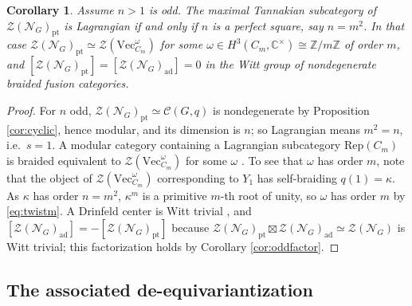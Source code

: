 \documentclass[10pt]{article}
\theoremstyle{plain}
\newtheorem{corollary}[theorem]{Corollary}
\theoremstyle{definition}
\theoremstyle{plain}
\begin{document}
\begin{corollary}\label{cor:lag}
Assume $n>1$ is odd.  The maximal Tannakian subcategory of
$\mathcal{Z}(\mathcal{N}_G)_{\mathrm{pt}}$ is Lagrangian if and only if $n$ is a
perfect square, say $n=m^{2}$.  In that case
$\mathcal{Z}(\mathcal{N}_G)_{\mathrm{pt}}\simeq
\mathcal{Z}(\mathrm{Vec}^{\omega}_{C_m})$ for some
$\omega\in H^{3}(C_m,\mathbb{C}^{\times})\cong\mathbb{Z}/m\mathbb{Z}$ of order $m$, and
$[\mathcal{Z}(\mathcal{N}_G)_{\mathrm{pt}}]
=[\mathcal{Z}(\mathcal{N}_G)_{\mathrm{ad}}]=0$ in the Witt group of
nondegenerate braided fusion categories.
\end{corollary}
 
\begin{proof}
For $n$ odd, $\mathcal{Z}(\mathcal{N}_G)_{\mathrm{pt}}\simeq\mathcal{C}(G,q)$ is nondegenerate by
Proposition \ref{cor:cyclic}, hence modular, and its dimension is $n$; so
Lagrangian means $m^{2}=n$, i.e.\ $s=1$.  A modular category containing a
Lagrangian subcategory $\mathrm{Rep}(C_m)$ is braided equivalent to
$\mathcal{Z}(\mathrm{Vec}^{\omega}_{C_m})$ for some $\omega$ \cite[Theorem 4.64]{MR2609644}. To see that $\omega$ has order $m$, note that the object of $\mathcal{Z}(\mathrm{Vec}^{\omega}_{C_m})$ corresponding to $Y_1$ has self-braiding $q(1)=\kappa$. As $\kappa$ has order $n=m^2$, $\kappa^m$ is a primitive $m$-th root of unity, so $\omega$ has order $m$ by \eqref{eq:twistm}.  A Drinfeld center is Witt trivial \cite{MR3039775}, and
$[\mathcal{Z}(\mathcal{N}_G)_{\mathrm{ad}}]
=-[\mathcal{Z}(\mathcal{N}_G)_{\mathrm{pt}}]$ because
$\mathcal{Z}(\mathcal{N}_G)_{\mathrm{pt}}\boxtimes
\mathcal{Z}(\mathcal{N}_G)_{\mathrm{ad}}\simeq\mathcal{Z}(\mathcal{N}_G)$ is Witt
trivial; this factorization holds by Corollary \ref{cor:oddfactor}.
\end{proof}


\subsection{The associated de-equivariantization}\label{subsec:assocdeeq}
 
\end{document}
